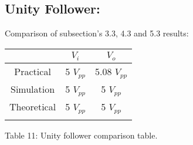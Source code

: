 \subsection{Unity Follower:}

Comparison of subsection's 3.3, 4.3 and 5.3 results: \hfill \break

\begin{center}
\begin{tabular}[.5cm]{c c c}
\toprule
\toprule
& \hspace{85pt} $V_{i}$ \hspace{85pt} & \hspace{85pt} $V_{o}$ \hspace{85pt} \\
\midrule
\midrule
Practical & 5 $V_{pp}$ & 5.08 $V_{pp}$ \\
\cmidrule{1-3}
Simulation & 5 $V_{pp}$ & 5 $V_{pp}$ \\
\cmidrule{1-3}
Theoretical & 5 $V_{pp}$ & 5 $V_{pp}$ \\
\bottomrule
\linebreak
\end{tabular}
\linebreak Table 11: Unity follower comparison table.
\end{center}

\pagebreak